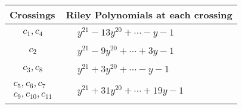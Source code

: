 \documentclass[1p]{elsarticle_modified}
\theoremstyle{definition}
\begin{document}
\begin{tabular}{m{50pt}|m{274pt}}
Crossings & \hspace{64pt}Riley Polynomials at each crossing \\
\hline $$\begin{aligned}c_{1},c_{4}\end{aligned}$$&$\begin{aligned}
&y^{21}-13 y^{20}+\cdots- y-1
\end{aligned}$\\
\hline $$\begin{aligned}c_{2}\end{aligned}$$&$\begin{aligned}
&y^{21}-9 y^{20}+\cdots+3 y-1
\end{aligned}$\\
\hline $$\begin{aligned}c_{3},c_{8}\end{aligned}$$&$\begin{aligned}
&y^{21}+3 y^{20}+\cdots- y-1
\end{aligned}$\\
\hline $$\begin{aligned}c_{5},c_{6},c_{7}\\c_{9},c_{10},c_{11}\end{aligned}$$&$\begin{aligned}
&y^{21}+31 y^{20}+\cdots+19 y-1
\end{aligned}$\\
\hline
\end{tabular}
\vskip 2pc
\end{document}
